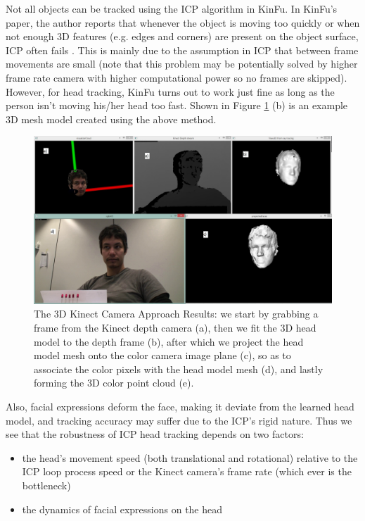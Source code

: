 Not all objects can be tracked using the ICP algorithm in KinFu.  In KinFu's paper, the author reports that whenever the object is moving too quickly or when not enough 3D features (e.g. edges and corners) are present on the object surface, ICP often fails \cite{pirovano2011kinfu}.  This is mainly due to the assumption in ICP that between frame movements are small (note that this problem may be potentially solved by higher frame rate camera with higher computational power so no frames are skipped).  However, for head tracking, KinFu turns out to work just fine as long as the person isn't moving his/her head too fast.  Shown in Figure \ref{fig:headTrackingResults} (b) is an example 3D mesh model created using the above method.
\begin{figure} [h]
	\centering
	\includegraphics[width=\textwidth]{./img/headTrackingResults1.jpg}
	\caption{The 3D Kinect Camera Approach Results: we start by grabbing a frame from the Kinect depth camera (a), then we fit the 3D head model to the depth frame (b), after which we project the head model mesh onto the color camera image plane (c), so as to associate the color pixels with the head model mesh (d), and lastly forming the 3D color point cloud (e).}
	\label{fig:headTrackingResults}
\end{figure}

Also, facial expressions deform the face, making it deviate from the learned head model, and tracking accuracy may suffer due to the ICP's rigid nature.  Thus we see that the robustness of ICP head tracking depends on two factors:
\begin{itemize}
	\item the head's movement speed (both translational and rotational) relative to the ICP loop process speed or the Kinect camera's frame rate (which ever is the bottleneck)
	\item the dynamics of facial expressions on the head
\end{itemize}

